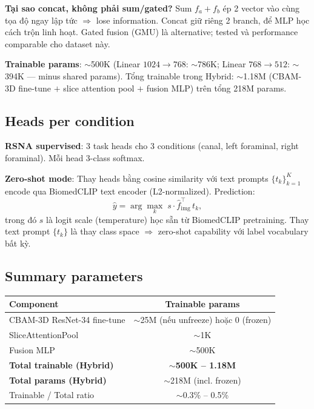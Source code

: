 \documentclass[11pt,a4paper]{article}
\begin{document}
\noindent\textbf{Tại sao concat, không phải sum/gated?} Sum $f_a + f_b$
ép 2 vector vào cùng tọa độ ngay lập tức $\Rightarrow$ lose
information. Concat giữ riêng 2 branch, để MLP học cách trộn linh hoạt.
Gated fusion (GMU) là alternative; tested và performance comparable
cho dataset này.

\noindent\textbf{Trainable params}: $\sim$500K (Linear $1024 \to 768$:
$\sim$786K; Linear $768 \to 512$: $\sim$394K --- minus shared params).
Tổng trainable trong Hybrid: $\sim$1.18M (CBAM-3D fine-tune $+$ slice
attention pool $+$ fusion MLP) trên tổng 218M params.

\subsection{Heads per condition}

\noindent\textbf{RSNA supervised}: 3 task heads cho 3 conditions
(canal, left foraminal, right foraminal). Mỗi head 3-class softmax.

\noindent\textbf{Zero-shot mode}: Thay heads bằng cosine similarity
với text prompts $\{t_k\}_{k=1}^{K}$ encode qua BiomedCLIP text encoder
(L2-normalized). Prediction:
\begin{equation}
\hat{y} = \arg\max_{k}\;
          s \cdot \hat{f}_{\text{img}}^{\top}\, t_k,
\label{eq:cosine_vi}
\end{equation}
trong đó $s$ là logit scale (temperature) học sẵn từ BiomedCLIP
pretraining. Thay text prompt $\{t_k\}$ là thay class space
$\Rightarrow$ zero-shot capability với label vocabulary bất kỳ.

\subsection{Summary parameters}

\begin{center}
\begin{tabular}{@{}lc@{}}
\toprule
Component & Trainable params \\
\midrule
CBAM-3D ResNet-34 fine-tune & $\sim$25M (nếu unfreeze) hoặc 0 (frozen) \\
SliceAttentionPool          & $\sim$1K \\
Fusion MLP                  & $\sim$500K \\
\midrule
\textbf{Total trainable (Hybrid)} & \textbf{$\sim$500K -- 1.18M} \\
\textbf{Total params (Hybrid)}    & $\sim$218M (incl. frozen) \\
Trainable / Total ratio           & $\sim$0.3\% -- 0.5\% \\
\bottomrule
\end{tabular}
\end{center}
\end{document}

